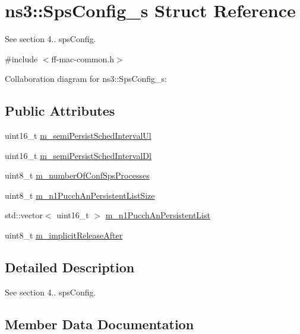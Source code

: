\hypertarget{structns3_1_1SpsConfig__s}{}\section{ns3\+:\+:Sps\+Config\+\_\+s Struct Reference}
\label{structns3_1_1SpsConfig__s}


See section 4.. sps\+Config.  




{\ttfamily \#include $<$ff-\/mac-\/common.\+h$>$}



Collaboration diagram for ns3\+:\+:Sps\+Config\+\_\+s\+:
\subsection*{Public Attributes}
\begin{DoxyCompactItemize}
\item 
uint16\+\_\+t \hyperlink{structns3_1_1SpsConfig__s_aa70dbd9ac18006670a927c6c52787a65}{m\+\_\+semi\+Persist\+Sched\+Interval\+Ul}
\item 
uint16\+\_\+t \hyperlink{structns3_1_1SpsConfig__s_aa82c2e6882a42613c302b4239d235343}{m\+\_\+semi\+Persist\+Sched\+Interval\+Dl}
\item 
uint8\+\_\+t \hyperlink{structns3_1_1SpsConfig__s_ab2f8fa9317e3d251dca48ab8906fbc02}{m\+\_\+number\+Of\+Conf\+Sps\+Processes}
\item 
uint8\+\_\+t \hyperlink{structns3_1_1SpsConfig__s_a46577c100c38a580b23ebd907300c957}{m\+\_\+n1\+Pucch\+An\+Persistent\+List\+Size}
\item 
std\+::vector$<$ uint16\+\_\+t $>$ \hyperlink{structns3_1_1SpsConfig__s_a456b8eeba0c9d89d892a881519751bfa}{m\+\_\+n1\+Pucch\+An\+Persistent\+List}
\item 
uint8\+\_\+t \hyperlink{structns3_1_1SpsConfig__s_a067f713a602ae669ca903a6c6f58abdd}{m\+\_\+implicit\+Release\+After}
\end{DoxyCompactItemize}


\subsection{Detailed Description}
See section 4.. sps\+Config. 

\subsection{Member Data Documentation}
